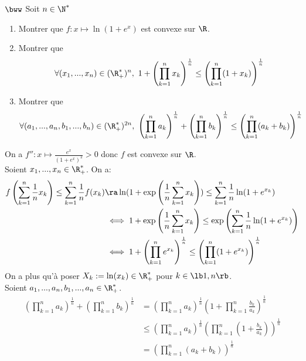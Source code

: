 \documentclass[11pt]{article}
\begin{document}
\begin{exercice}{$\bww$}{}
    Soit $n\in\N^*$
    \begin{enumerate}
        \item Montrer que $f:x\mapsto\ln(1+e^x)$ est convexe sur $\R$.
        \item Montrer que
        \begin{equation*}
            \forall (x_1,...,x_n) \in (\R_+^*)^n, ~ 1 + \left( \prod_{k=1}^n x_k \right)^{\frac{1}{n}} \leq \left( \prod_{k=1}^n(1+x_k)  \right)^{\frac{1}{n}}
        \end{equation*}
        \item Montrer que
        \begin{equation*}
            \forall (a_1,...,a_n,b_1,...,b_n)\in(\R_+^*)^{2n}, ~ \left( \prod_{k=1}^na_k \right)^{\frac{1}{n}} + \left( \prod_{k=1}^nb_k \right)^{\frac{1}{n}} \leq \left( \prod_{k=1}^n(a_k+b_k) \right)^{\frac{1}{n}}
        \end{equation*}
    \end{enumerate}
    \tcblower
     On a $f'':x\mapsto\frac{e^x}{(1+e^x)^2}>0$ donc $f$ est convexe sur $\R$.\\
     Soient $x_1,...,x_n\in\R_+^*$. On a:
    \begin{align*}
        f\left( \sum_{k=1}^n\frac{1}{n}x_k \right) \leq \sum_{k=1}^n\frac{1}{n}f(x_k) &\ra \ln(1+\exp\left( \frac{1}{n}\sum_{k=1}^nx_k \right)) \leq \sum_{k=1}^n\frac{1}{n}\ln(1+e^{x_k})\\
        &\iff 1 + \exp\left( \frac{1}{n}\sum_{k=1}^nx_k \right) \leq \exp\left( \sum_{k=1}^n\frac{1}{n}\ln(1+e^{x_k}) \right)\\
        &\iff 1 + \left( \prod_{k=1}^n e^{x_k} \right)^{\frac{1}{n}} \leq \left( \prod_{k=1}^n (1+e^{x_k}) \right)^{\frac{1}{n}}
    \end{align*}
    On a plus qu'à poser $X_k:=\ln(x_k)\in\R_+^*$ pour $k\in\lb1,n\rb$.\\
     Soient $a_1,...,a_n,b_1,...,a_n\in\R_+^*$.
    \begin{align*}
        \left( \prod_{k=1}^na_k \right)^\frac{1}{n} + \left( \prod_{k=1}^nb_k \right)^{\frac{1}{n}} &= \left( \prod_{k=1}^n a_k \right)^{\frac{1}{n}}\left( 1+\prod_{k=1}^n\frac{b_k}{a_k} \right)^{\frac{1}{n}}\\
        &\leq \left(\prod_{k=1}^na_k\right)^{\frac{1}{n}}\left( \prod_{k=1}^n(1+\frac{b_k}{a_k}) \right)^{\frac{1}{n}}\\
        &=\left( \prod_{k=1}^n(a_k+b_k) \right)^{\frac{1}{n}}
    \end{align*}
\end{exercice}
\end{document}
